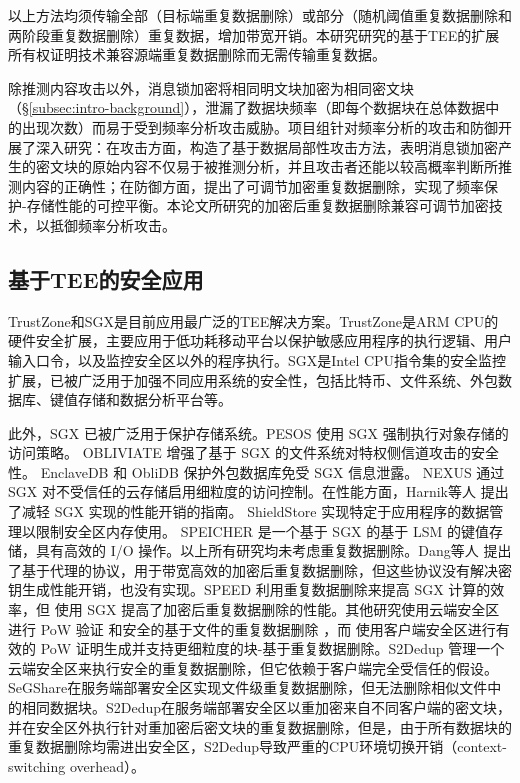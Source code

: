 以上方法均须传输全部（目标端重复数据删除）或部分（随机阈值重复数据删除和两阶段重复数据删除）重复数据，增加带宽开销。本研究研究的基于TEE的扩展所有权证明技术兼容源端重复数据删除而无需传输重复数据。 

除推测内容攻击以外，消息锁加密将相同明文块加密为相同密文块（\S\ref{subsec:intro-background}），泄漏了数据块频率（即每个数据块在总体数据中的出现次数）而易于受到频率分析攻击威胁。项目组针对频率分析的攻击和防御开展了深入研究：在攻击方面，构造了基于数据局部性攻击方法，表明消息锁加密产生的密文块的原始内容不仅易于被推测分析\cite{li2020Info}，并且攻击者还能以较高概率判断所推测内容的正确性\cite{li2022revisiting}；在防御方面，提出了可调节加密重复数据删除\cite{li2020balancing}，实现了频率保护-存储性能的可控平衡。本论文所研究的加密后重复数据删除兼容可调节加密技术，以抵御频率分析攻击。

\subsection{基于TEE的安全应用}
\label{subsec:compare-tee}

TrustZone和SGX是目前应用最广泛的TEE解决方案\cite{pinto19}。TrustZone是ARM CPU的硬件安全扩展，主要应用于低功耗移动平台以保护敏感应用程序的执行逻辑\cite{rubinov2016automated}、用户输入口令\cite{ying2018truz}，以及监控安全区以外的程序执行\cite{azab2014hypervision}。SGX是Intel CPU指令集的安全监控扩展，已被广泛用于加强不同应用系统的安全性，包括比特币\cite{matetic19}、文件系统\cite{ahmad2018OBLIVIATE,shinde20}、外包数据库\cite{eskandarian17,priebe18,sun21}、键值存储\cite{mishra18,bailleu2019SPEICHER,kim19,bailleu2021Avocado}和数据分析平台\cite{schuster15, zheng2017Opaque, bowe2020ZEXE}等。

此外，SGX \cite{sgx} 已被广泛用于保护存储系统。PESOS \cite{krahn18} 使用 SGX 强制执行对象存储的访问策略。 OBLIVIATE \cite{ahmad2018OBLIVIATE} 增强了基于 SGX 的文件系统对特权侧信道攻击的安全性。 EnclaveDB \cite{priebe18} 和 ObliDB \cite{eskandarian19} 保护外包数据库免受 SGX 信息泄露。 NEXUS \cite{djoko19} 通过 SGX 对不受信任的云存储启用细粒度的访问控制。在性能方面，Harnik等人\cite{harnik18} 提出了减轻 SGX 实现的性能开销的指南。 ShieldStore \cite{kim19} 实现特定于应用程序的数据管理以限制安全区内存使用。 SPEICHER \cite{bailleu2019SPEICHER} 是一个基于 SGX 的基于 LSM 的键值存储，具有高效的 I/O 操作。以上所有研究均未考虑重复数据删除。Dang等人\cite{dang17} 提出了基于代理的协议，用于带宽高效的加密后重复数据删除，但这些协议没有解决密钥生成性能开销，也没有实现。SPEED \cite{cui19} 利用重复数据删除来提高 SGX 计算的效率，但 \sysnameS 使用 SGX 提高了加密后重复数据删除的性能。其他研究使用云端安全区进行 PoW 验证 \cite{you2020Proofs} 和安全的基于文件的重复数据删除 \cite{fuhry20}，而 \sysnameS 使用客户端安全区进行有效的 PoW 证明生成并支持更细粒度的块-基于重复数据删除。S2Dedup \cite{miranda21} 管理一个云端安全区来执行安全的重复数据删除，但它依赖于客户端完全受信任的假设。SeGShare\cite{fuhry2020segshare}在服务端部署安全区实现文件级重复数据删除，但无法删除相似文件中的相同数据块。S2Dedup\cite{miranda21}在服务端部署安全区以重加密来自不同客户端的密文块，并在安全区外执行针对重加密后密文块的重复数据删除，但是，由于所有数据块的重复数据删除均需进出安全区，S2Dedup导致严重的CPU环境切换开销（context-switching overhead）\cite{weisse2017regaining}。

